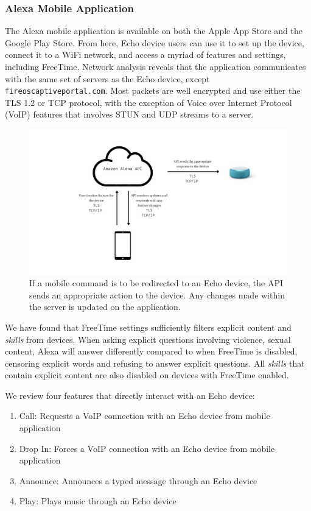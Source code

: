 \documentclass[12pt]{ucthesis}
\begin{document}
\subsubsection{Alexa Mobile Application}
The Alexa mobile application is available on both the Apple App Store and the Google Play Store. From here, Echo device users can use it to set up the device, connect it to a WiFi network, and access a myriad of features and settings, including FreeTime. Network analysis reveals that the application communicates with the same set of servers as the Echo device, except \texttt{fireoscaptiveportal.com}. Most packets are well encrypted and use either the TLS 1.2 or TCP protocol, with the exception of Voice over Internet Protocol (VoIP) features that involves STUN and UDP streams to a server.

\begin{figure}
    \includegraphics[width=\textwidth]{mobile command.jpg}
    \caption{If a mobile command is to be redirected to an Echo device, the API sends an appropriate action to the device. Any changes made within the server is updated on the application.}
    \label{fig:mobilecomm}
\end{figure}

We have found that FreeTime settings sufficiently filters explicit content and \textit{skills} from devices. When asking explicit questions involving violence, sexual content, Alexa will answer differently compared to when FreeTime is disabled, censoring explicit words and refusing to answer explicit questions. All \textit{skills} that contain explicit content are also disabled on devices with FreeTime enabled.

We review four features that directly interact with an Echo device:
\begin{enumerate}
\item Call: Requests a VoIP connection with an Echo device from mobile application
\item Drop In: Forces a VoIP connection with an Echo device from mobile application
\item Announce: Announces a typed message through an Echo device
\item Play: Plays music through an Echo device
\end{enumerate}
\end{document}
